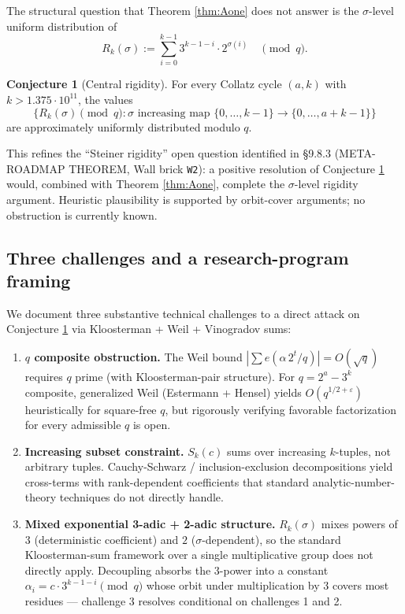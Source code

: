 \documentclass[
  11pt]{amsart}
\theoremstyle{plain}
\theoremstyle{definition}
\newtheorem{conjecture}[theorem]{Conjecture}
\theoremstyle{remark}
\begin{document}
The structural question that Theorem \ref{thm:Aone} does not answer is
the \(\sigma\)-level uniform distribution of \[
R_k(\sigma) := \sum_{i=0}^{k-1} 3^{k-1-i} \cdot 2^{\sigma(i)}
\quad \pmod{q}.
\]

\begin{conjecture}[Central rigidity]
\label{conj:Atwo}
For every Collatz cycle $(a, k)$ with $k > 1.375 \cdot 10^{11}$, the
values
$$
\bigl\{ R_k(\sigma) \pmod{q} : \sigma \text{ increasing map }
\{0, \dots, k{-}1\} \to \{0, \dots, a{+}k{-}1\} \bigr\}
$$
are approximately uniformly distributed modulo $q$.
\end{conjecture}

This refines the ``Steiner rigidity'' open question identified in §9.8.3
(META-ROADMAP THEOREM, Wall brick \texttt{W2}): a positive resolution of
Conjecture \ref{conj:Atwo} would, combined with Theorem \ref{thm:Aone},
complete the \(\sigma\)-level rigidity argument. Heuristic plausibility
is supported by orbit-cover arguments; no obstruction is currently
known.

\subsection{Three challenges and a research-program
framing}\label{three-challenges-and-a-research-program-framing}

We document three substantive technical challenges to a direct attack on
Conjecture \ref{conj:Atwo} via Kloosterman + Weil + Vinogradov sums:

\begin{enumerate}
\def\labelenumi{\arabic{enumi}.}
\item
  \textbf{\(q\) composite obstruction.} The Weil bound
  \(|\sum e(\alpha\, 2^t / q)| = O(\sqrt{q})\) requires \(q\) prime
  (with Kloosterman-pair structure). For \(q = 2^a - 3^k\) composite,
  generalized Weil (Estermann + Hensel) yields
  \(O(q^{1/2 + \varepsilon})\) heuristically for square-free \(q\), but
  rigorously verifying favorable factorization for every admissible
  \(q\) is open.
\item
  \textbf{Increasing subset constraint.} \(S_k(c)\) sums over increasing
  \(k\)-tuples, not arbitrary tuples. Cauchy-Schwarz /
  inclusion-exclusion decompositions yield cross-terms with
  rank-dependent coefficients that standard analytic-number-theory
  techniques do not directly handle.
\item
  \textbf{Mixed exponential 3-adic + 2-adic structure.} \(R_k(\sigma)\)
  mixes powers of \(3\) (deterministic coefficient) and \(2\)
  (\(\sigma\)-dependent), so the standard Kloosterman-sum framework over
  a single multiplicative group does not directly apply. Decoupling
  absorbs the \(3\)-power into a constant
  \(\alpha_i = c \cdot 3^{k-1-i} \pmod{q}\) whose orbit under
  multiplication by \(3\) covers most residues --- challenge 3 resolves
  conditional on challenges 1 and 2.
\end{enumerate}
\end{document}
